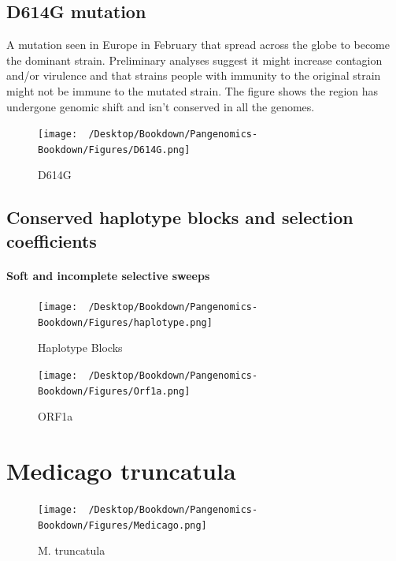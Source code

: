 \documentclass[
]{book}
\begin{document}
\hypertarget{d614g-mutation}{%
\subsection{D614G mutation}\label{d614g-mutation}}

A mutation seen in Europe in February that spread across the globe to become the dominant strain. Preliminary analyses suggest it might increase contagion and/or virulence and that strains people with immunity to the original strain might not be immune to the mutated strain. The figure shows the region has undergone genomic shift and isn't conserved in all the genomes.

\begin{figure}
\centering
\texttt{[image: ~/Desktop/Bookdown/Pangenomics-Bookdown/Figures/D614G.png]}
\caption{D614G}
\end{figure}

\hypertarget{conserved-haplotype-blocks-and-selection-coefficients}{%
\subsection{Conserved haplotype blocks and selection coefficients}\label{conserved-haplotype-blocks-and-selection-coefficients}}

\hypertarget{soft-and-incomplete-selective-sweeps}{%
\paragraph*{Soft and incomplete selective sweeps}\label{soft-and-incomplete-selective-sweeps}}

\begin{figure}
\centering
\texttt{[image: ~/Desktop/Bookdown/Pangenomics-Bookdown/Figures/haplotype.png]}
\caption{Haplotype Blocks}
\end{figure}

\begin{figure}
\centering
\texttt{[image: ~/Desktop/Bookdown/Pangenomics-Bookdown/Figures/Orf1a.png]}
\caption{ORF1a}
\end{figure}

\hypertarget{medicago-truncatula}{%
\section{Medicago truncatula}\label{medicago-truncatula}}

\begin{figure}
\centering
\texttt{[image: ~/Desktop/Bookdown/Pangenomics-Bookdown/Figures/Medicago.png]}
\caption{M. truncatula}
\end{figure}
\end{document}
